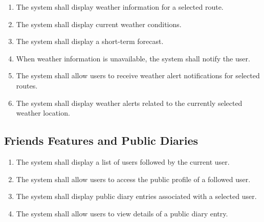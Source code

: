 \begin{enumerate}[label=\textbf{FR\arabic*}, ref=FR\arabic*, resume]

\item \label{fr-watch:fr21}
The system shall display weather information for a selected route.

\item \label{fr-watch:fr22}
The system shall display current weather conditions.

\item \label{fr-watch:fr23}
The system shall display a short-term forecast.

\item \label{fr-watch:fr24}
When weather information is unavailable, the system shall notify the user.

\item \label{fr-watch:fr25}
The system shall allow users to receive weather alert notifications for selected routes.

\item \label{fr-watch:fr26}
The system shall display weather alerts related to the currently selected weather location.


\end{enumerate}


\subsection{Friends Features and Public Diaries}

\begin{enumerate}[label=\textbf{FR\arabic*}, ref=FR\arabic*, resume]

\item \label{fr-watch:fr28}
The system shall display a list of users followed by the current user.

\item \label{fr-watch:fr29}
The system shall allow users to access the public profile of a followed user.

\item \label{fr-watch:fr30}
The system shall display public diary entries associated with a selected user.

\item \label{fr-watch:fr31}
The system shall allow users to view details of a public diary entry.

\end{enumerate}




